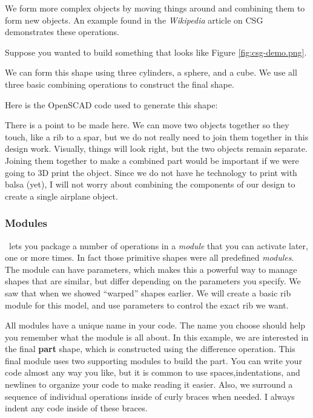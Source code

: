 We form more complex objects by moving things around and combining them to form
new objects. An example found in the {\it Wikipedia} article on CSG~\cite{csgwiki}
demonstrates these operations.

Suppose you wanted to build something that looks like Figure \ref{fig:csg-demo.png}.


We can form this shape using three cylinders, a sphere, and a cube. We use all
three basic combining operations to construct the final shape.

Here is the OpenSCAD code used to generate this shape:


There is a point to be made here. We can move two objects together so they
touch, like a rib to a spar, but we do not really need to join them together in
this design work. Visually, things will look right, but the two objects remain
separate. Joining them together to make a combined part would be important if we
were going to 3D print the object. Since we do not have he technology to print
with balsa (yet), I will not worry about combining the components of our design
to create a single airplane object.

\subsubsection{Modules}

\osc\ lets you package a number of operations in a {\it module} that you can
activate later, one or more times. In fact those primitive shapes were all
predefined {\it modules}. The module can have parameters, which makes this a
powerful way to manage shapes that are similar, but differ depending on the
parameters you specify.  We saw that when we showed ``warped'' shapes earlier.
We will create a basic rib module for this model, and use parameters to control
the exact rib we want.

All modules have a unique name in your code.  The name you choose should help
you remember what the module is all about. In this example, we are interested
in the final {\bf part} shape, which is constructed using the difference
operation. This final module uses two supporting modules to build the part. You
can write your code almost any way you like, but it is common to use
spaces,indentations, and newlines to organize your code to make reading it
easier.  Also, we surround a sequence of individual operations inside of curly
braces when needed. I always indent any code inside of these braces.

